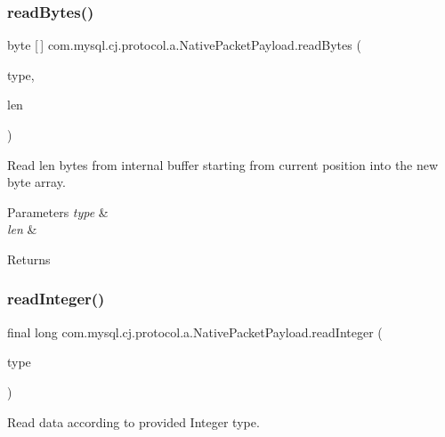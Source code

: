 \subsubsection{\texorpdfstring{read\+Bytes()}{readBytes()}\hspace{0.1cm}{\footnotesize\ttfamily [2/2]}}
{\footnotesize\ttfamily byte \mbox{[}$\,$\mbox{]} com.\+mysql.\+cj.\+protocol.\+a.\+Native\+Packet\+Payload.\+read\+Bytes (\begin{DoxyParamCaption}\item[{String\+Length\+Data\+Type}]{type,  }\item[{int}]{len }\end{DoxyParamCaption})}

Read len bytes from internal buffer starting from current position into the new byte array.


\begin{DoxyParams}{Parameters}
{\em type} & \\
\hline
{\em len} & \\
\hline
\end{DoxyParams}
\begin{DoxyReturn}{Returns}

\end{DoxyReturn}
\mbox{\label{classcom_1_1mysql_1_1cj_1_1protocol_1_1a_1_1_native_packet_payload_a1e4284bb772c7244ad163927017f13dc}} 
\subsubsection{\texorpdfstring{read\+Integer()}{readInteger()}}
{\footnotesize\ttfamily final long com.\+mysql.\+cj.\+protocol.\+a.\+Native\+Packet\+Payload.\+read\+Integer (\begin{DoxyParamCaption}\item[{\mbox{\hyperlink{enumcom_1_1mysql_1_1cj_1_1protocol_1_1a_1_1_native_constants_1_1_integer_data_type}{Integer\+Data\+Type}}}]{type }\end{DoxyParamCaption})}

Read data according to provided Integer type.



